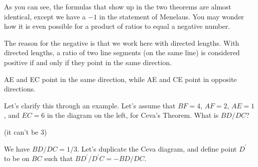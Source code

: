 As you can see, the formulas that show up in the two theorems are almost identical, except we have a $-1$ in the statement of Menelaus. You may wonder how it is even possible for a product of ratios to equal a negative number.



The reason for the negative is that we work here with directed lengths. With directed lengths, a ratio of two line segments (on the same line) is considered positive if and only if they point in the same direction.


AE and EC point in the same direction, while AE and CE point in opposite directions.

Let’s clarify this through an example. Let’s assume that $BF = 4$, $AF = 2$, $AE = 1$, and $EC = 6$ in the diagram on the left, for Ceva’s Theorem. What is $BD/DC$?

(it can't be 3)







We have $BD/DC = 1/3$. Let's duplicate the Ceva diagram, and define point $D^\prime$ to be on $BC$ such that $BD^\prime/D^\prime C = -BD/DC$.




